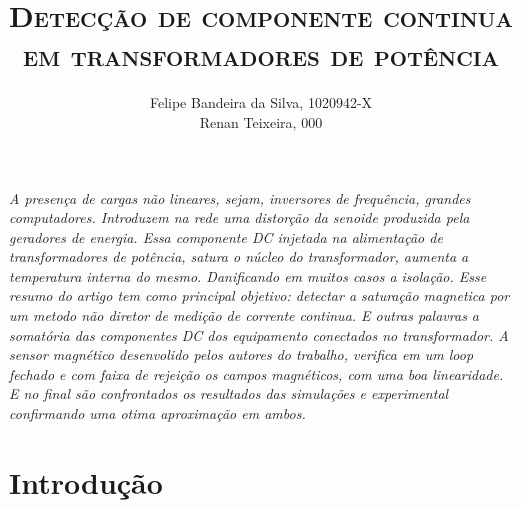 \documentclass[paper=a4, fontsize=11pt]{article}
\title{\textsc{Detecção de componente continua em transformadores de potência}}
\author{Felipe Bandeira da Silva, 1020942-X\\Renan Teixeira, 000}
\begin{document}
\maketitle

\textit{A presença de cargas não lineares, sejam, inversores de frequência, grandes computadores. Introduzem na rede uma distorção da senoide produzida pela geradores de energia. Essa componente DC injetada na alimentação de transformadores de potência, satura o núcleo do transformador, aumenta a temperatura interna do mesmo. Danificando em muitos casos a isolação. Esse resumo do artigo tem como principal objetivo: detectar a saturação magnetica por um metodo não diretor de medição de corrente continua. E outras palavras a somatória das componentes DC dos equipamento conectados no transformador. A sensor magnético desenvolido pelos autores do trabalho, verifica em um loop fechado e com faixa de rejeição os campos magnéticos, com uma boa linearidade. E no final são confrontados os resultados das simulações e experimental confirmando uma otima aproximação em ambos.}

\newpage

\tableofcontents

\newpage

\listoffigures


\newpage
\section{Introdução}
\end{document}
